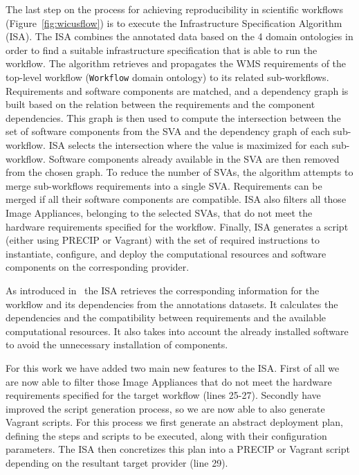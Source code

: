 The last step on the process for achieving reproducibility in scientific workflows (Figure~\ref{fig:wicusflow}) is to execute the Infrastructure Specification Algorithm (ISA). The ISA combines the annotated data based on the 4 domain ontologies in order to find a suitable infrastructure specification that is able to run the workflow. The algorithm retrieves and propagates the WMS requirements of the top-level workflow (\texttt{Workflow} domain ontology) to its related sub-workflows. Requirements and software components are matched, and a dependency graph is built based on the relation between the requirements and the component dependencies. This graph is then used to compute the intersection between the set of software components from the SVA and the dependency graph of each sub-workflow. ISA selects the intersection where the value is maximized for each sub-workflow. Software components already available in the SVA are then removed from the chosen graph. To reduce the number of SVAs, the algorithm attempts to merge sub-workflows requirements into a single SVA. Requirements can be merged if all their software components are compatible. ISA also filters all those Image Appliances, belonging to the selected SVAs, that do not meet the hardware requirements specified for the workflow. Finally, ISA generates a script (either using PRECIP or Vagrant) with the set of required instructions to instantiate, configure, and deploy the computational resources and software components on the corresponding provider.

As introduced in~\cite{wicus} the ISA retrieves the corresponding information for the workflow and its dependencies from the annotations datasets. It calculates the dependencies and the compatibility between requirements and the available computational resources. It also takes into account the already installed software to avoid the unnecessary installation of components.

For this work we have added two main new features to the ISA. First of all we are now able to filter those Image Appliances that do not meet the hardware requirements specified for the target workflow (lines 25-27). Secondly have improved the script generation process, so we are now able to also generate Vagrant scripts. For this process we first generate an abstract deployment plan, defining the steps and scripts to be executed, along with their configuration parameters. The ISA then concretizes this plan into a PRECIP or Vagrant script depending on the resultant target provider (line 29).

